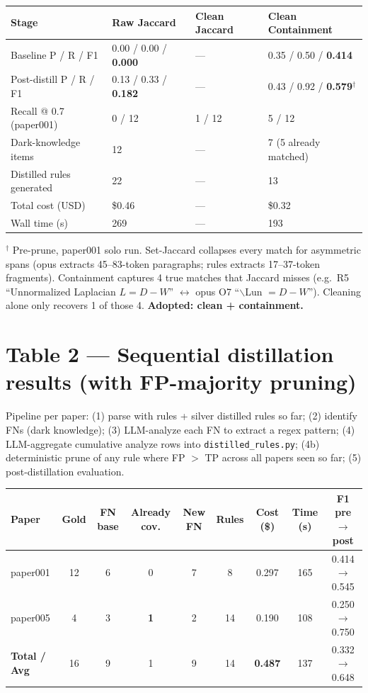 \documentclass[10pt]{article}
\begin{document}
\medskip
\begin{tabular}{lC{2.8cm}C{2.8cm}C{2.8cm}}
\toprule
\textbf{Stage} & \textbf{Raw Jaccard} & \textbf{Clean Jaccard} & \textbf{Clean Containment} \\
\midrule
Baseline P / R / F1 & 0.00 / 0.00 / \textbf{0.000} & --- & 0.35 / 0.50 / \textbf{0.414} \\
Post-distill P / R / F1 & 0.13 / 0.33 / \textbf{0.182} & --- & 0.43 / 0.92 / \textbf{0.579}$^\dagger$ \\
Recall @ 0.7 (paper001) & 0 / 12 & 1 / 12 & 5 / 12 \\
Dark-knowledge items & 12 & --- & 7 (5 already matched) \\
Distilled rules generated & 22 & --- & 13 \\
Total cost (USD) & \$0.46 & --- & \$0.32 \\
Wall time (s) & 269 & --- & 193 \\
\bottomrule
\end{tabular}

\medskip
\noindent
{\small $^\dagger$ Pre-prune, paper001 solo run. Set-Jaccard collapses every match for asymmetric spans (opus extracts 45--83-token paragraphs; rules extracts 17--37-token fragments). Containment captures 4 true matches that Jaccard misses (e.g.\ R5 ``Unnormalized Laplacian $L=D-W$'' $\leftrightarrow$ opus O7 ``$\backslash$Lun $= D-W$''). Cleaning alone only recovers 1 of those 4. \textbf{Adopted: clean + containment.}}

\section*{Table 2 --- Sequential distillation results (with FP-majority pruning)}

\noindent
Pipeline per paper: (1) parse with rules + silver distilled rules so far; (2) identify FNs (dark knowledge); (3) LLM-analyze each FN to extract a regex pattern; (4) LLM-aggregate cumulative analyze rows into \texttt{distilled\_rules.py}; (4b) deterministic prune of any rule where FP $>$ TP across all papers seen so far; (5) post-distillation evaluation.

\medskip
\begin{tabular}{lcccccccc}
\toprule
\textbf{Paper} & \textbf{Gold} & \textbf{FN base} & \textbf{Already cov.} & \textbf{New FN} & \textbf{Rules} & \textbf{Cost (\$)} & \textbf{Time (s)} & \textbf{F1 pre $\to$ post} \\
\midrule
paper001 & 12 & 6 & 0 & 7 & 8  & 0.297 & 165 & 0.414 $\to$ 0.545 \\
paper005 & 4  & 3 & \textbf{1} & 2 & 14 & 0.190 & 108 & 0.250 $\to$ 0.750 \\
\midrule
\textbf{Total / Avg} & 16 & 9 & 1 & 9 & 14 & \textbf{0.487} & 137 & 0.332 $\to$ 0.648 \\
\bottomrule
\end{tabular}
\end{document}
